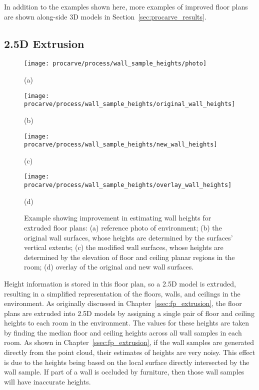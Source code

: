 \documentclass[12pt,onecolumn,oneside]{book}
\begin{document}
In addition to the examples shown here, more examples of improved floor plans are shown along-side 3D models in Section~\ref{sec:procarve_results}.

\subsection{2.5D Extrusion}
\label{ssec:octree_fp_extrusion}

\begin{figure}

	\centering
	\begin{minipage}[t]{0.45\linewidth}
		\centerline{\texttt{[image: procarve/process/wall\_sample\_heights/photo]}}
		\centerline{(a)}
	\end{minipage}
	\hfill
	\begin{minipage}[t]{0.45\linewidth}
		\centerline{\texttt{[image: procarve/process/wall\_sample\_heights/original\_wall\_heights]}}
		\centerline{(b)}
	\end{minipage}
	
	\begin{minipage}[t]{0.45\linewidth}
		\centerline{\texttt{[image: procarve/process/wall\_sample\_heights/new\_wall\_heights]}}
		\centerline{(c)}
	\end{minipage}
	\hfill
	\begin{minipage}[t]{0.45\linewidth}
		\centerline{\texttt{[image: procarve/process/wall\_sample\_heights/overlay\_wall\_heights]}}
		\centerline{(d)}
	\end{minipage}

	\caption[Comparison of wall extrusion methods.]{Example showing improvement in estimating wall heights for extruded floor plans: (a) reference photo of environment; (b) the original wall surfaces, whose heights are determined by the surfaces' vertical extents; (c) the modified wall surfaces, whose heights are determined by the elevation of floor and ceiling planar regions in the room; (d) overlay of the original and new wall surfaces.}
	\label{fig:octree_wall_sample_heights}
\end{figure}

Height information is stored in this floor plan, so a 2.5D model is extruded, resulting in a simplified representation of the floors, walls, and ceilings in the environment.  As originally discussed in Chapter~\ref{ssec:fp_extrusion}, the floor plans are extruded into 2.5D models by assigning a single pair of floor and ceiling heights to each room in the environment.  The values for these heights are taken by finding the median floor and ceiling heights across all wall samples in each room.  As shown in Chapter~\ref{ssec:fp_extrusion}, if the wall samples are generated directly from the point cloud, their estimates of heights are very noisy.  This effect is due to the heights being based on the local surface directly intersected by the wall sample.  If part of a wall is occluded by furniture, then those wall samples will have inaccurate heights.
\end{document}
